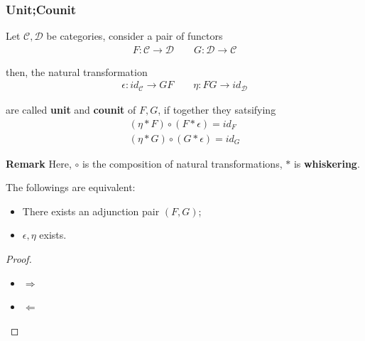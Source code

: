 \documentclass[Total.tex]{subfiles}
\begin{document}
			\subsubsection{Unit;Counit}
			
			\begin{Def}
				Let $\mathcal{C},\mathcal{D}$ be categories, consider a pair of functors
				\begin{gather*}
					F:\mathcal{C}\rightarrow \mathcal{D}\qquad G:\mathcal{D}\rightarrow \mathcal{C}
				\end{gather*}
				
				then, the natural transformation
				\begin{gather*}
					\epsilon:id_\mathcal{C}\rightarrow GF\qquad \eta:FG\rightarrow id_\mathcal{D}
				\end{gather*}
				
				are called \textbf{unit} and \textbf{counit} of $F,G$, if together they satsifying
				\begin{gather*}
					(\eta*F)\circ (F*\epsilon)=id_F\\
					(\eta*G)\circ (G*\epsilon)=id_G
				\end{gather*}
				\begin{center}
				\end{center}
				
				\textbf{Remark} Here, $\circ$ is the composition of natural transformations, $*$ is \textbf{whiskering}.
			\end{Def}
			
			
			\begin{proposition}
				The followings are equivalent:
				\begin{itemize}
					\item There exists an adjunction pair $(F,G)$;
					\item $\epsilon,\eta$ exists.
				\end{itemize}
			\end{proposition}
			\begin{proof}
				\begin{itemize}
					\item $\Rightarrow$
					\item $\Leftarrow$ 
				\end{itemize}
			\end{proof}
\end{document}
